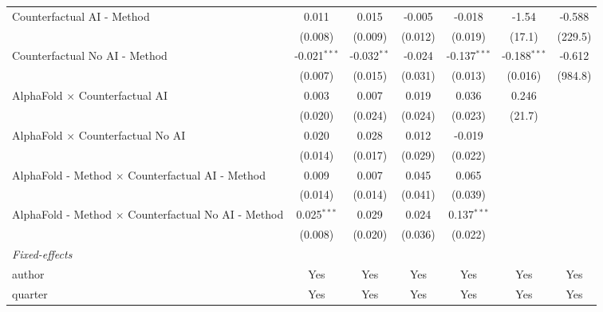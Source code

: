 \begin{tabular}{lcccccc}
   Counterfactual AI - Method                                 & 0.011          & 0.015         & -0.005  & -0.018         & -1.54          & -0.588\\   
                                                              & (0.008)        & (0.009)       & (0.012) & (0.019)        & (17.1)         & (229.5)\\   
   Counterfactual No AI - Method                              & -0.021$^{***}$ & -0.032$^{**}$ & -0.024  & -0.137$^{***}$ & -0.188$^{***}$ & -0.612\\   
                                                              & (0.007)        & (0.015)       & (0.031) & (0.013)        & (0.016)        & (984.8)\\   
   AlphaFold $\times$ Counterfactual AI                       & 0.003          & 0.007         & 0.019   & 0.036          & 0.246          &   \\   
                                                              & (0.020)        & (0.024)       & (0.024) & (0.023)        & (21.7)         &   \\   
   AlphaFold $\times$ Counterfactual No AI                    & 0.020          & 0.028         & 0.012   & -0.019         &                &   \\   
                                                              & (0.014)        & (0.017)       & (0.029) & (0.022)        &                &   \\   
   AlphaFold - Method $\times$ Counterfactual AI - Method     & 0.009          & 0.007         & 0.045   & 0.065          &                &   \\   
                                                              & (0.014)        & (0.014)       & (0.041) & (0.039)        &                &   \\   
   AlphaFold - Method $\times$ Counterfactual No AI - Method  & 0.025$^{***}$  & 0.029         & 0.024   & 0.137$^{***}$  &                &   \\   
                                                              & (0.008)        & (0.020)       & (0.036) & (0.022)        &                &   \\   
   \midrule
   \emph{Fixed-effects}\\
   author                                                     & Yes            & Yes           & Yes     & Yes            & Yes            & Yes\\  
   quarter                                                    & Yes            & Yes           & Yes     & Yes            & Yes            & Yes\\  

\end{tabular}
